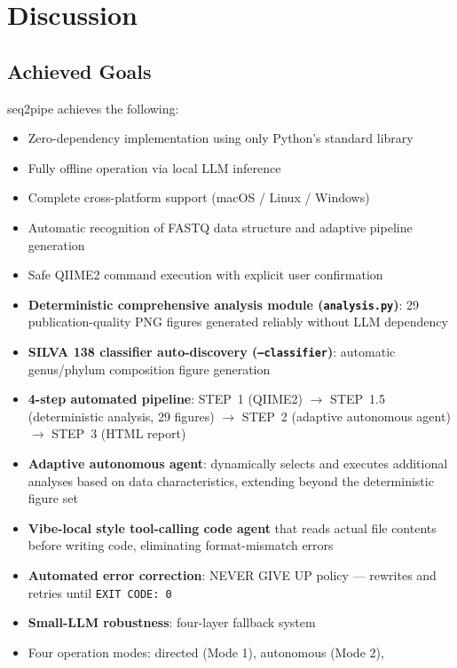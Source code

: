 \documentclass[12pt, a4paper]{article}
\begin{document}
\section{Discussion}

\subsection{Achieved Goals}

seq2pipe achieves the following:

\begin{itemize}
  \item Zero-dependency implementation using only Python's standard library
  \item Fully offline operation via local LLM inference
  \item Complete cross-platform support (macOS / Linux / Windows)
  \item Automatic recognition of FASTQ data structure and adaptive pipeline generation
  \item Safe QIIME2 command execution with explicit user confirmation
  \item \textbf{Deterministic comprehensive analysis module (\texttt{analysis.py})}:
    29 publication-quality PNG figures generated reliably without LLM dependency
  \item \textbf{SILVA 138 classifier auto-discovery (\texttt{--classifier})}:
    automatic genus/phylum composition figure generation
  \item \textbf{4-step automated pipeline}:
    STEP~1 (QIIME2) $\to$ STEP~1.5 (deterministic analysis, 29 figures)
    $\to$ STEP~2 (adaptive autonomous agent) $\to$ STEP~3 (HTML report)
  \item \textbf{Adaptive autonomous agent}:
    dynamically selects and executes additional analyses based on
    data characteristics, extending beyond the deterministic figure set
  \item \textbf{Vibe-local style tool-calling code agent} that reads actual file
    contents before writing code, eliminating format-mismatch errors
  \item \textbf{Automated error correction}: NEVER GIVE UP policy ---
    rewrites and retries until \texttt{EXIT CODE: 0}
  \item \textbf{Small-LLM robustness}: four-layer fallback system
  \item Four operation modes: directed (Mode 1), autonomous (Mode 2),

\end{itemize}
\end{document}
